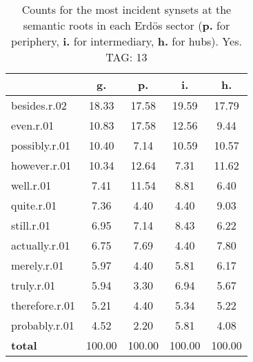 \begin{table}[h!]
\begin{center}
\begin{tabular}{| l | c | c | c | c |}\hline
 & g. & p. & i. & h. \\\hline
besides.r.02 & 18.33  & 17.58  & 19.59  & 17.79 \\\hline
even.r.01 & 10.83  & 17.58  & 12.56  & 9.44 \\\hline
possibly.r.01 & 10.40  & 7.14  & 10.59  & 10.57 \\\hline
however.r.01 & 10.34  & 12.64  & 7.31  & 11.62 \\\hline
well.r.01 & 7.41  & 11.54  & 8.81  & 6.40 \\\hline
quite.r.01 & 7.36  & 4.40  & 4.40  & 9.03 \\\hline
still.r.01 & 6.95  & 7.14  & 8.43  & 6.22 \\\hline
actually.r.01 & 6.75  & 7.69  & 4.40  & 7.80 \\\hline
merely.r.01 & 5.97  & 4.40  & 5.81  & 6.17 \\\hline
truly.r.01 & 5.94  & 3.30  & 6.94  & 5.67 \\\hline
therefore.r.01 & 5.21  & 4.40  & 5.34  & 5.22 \\\hline
probably.r.01 & 4.52  & 2.20  & 5.81  & 4.08 \\\hline
{{\bf total}} & 100.00  & 100.00  & 100.00  & 100.00 \\\hline
\end{tabular}
\caption{Counts for the most incident synsets at the semantic roots in each Erd\"os sector ({\bf p.} for periphery, {\bf i.} for intermediary, {\bf h.} for hubs). Yes. TAG: 13}
\end{center}
\end{table}